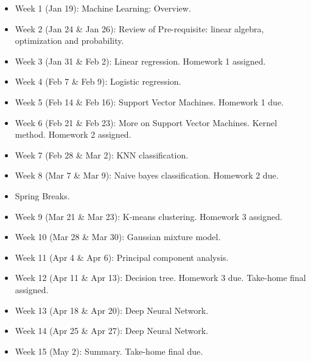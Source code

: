 \documentclass[a4paper,10pt]{article}
\begin{document}
\begin{itemize}
\item Week 1 (Jan 19): Machine Learning: Overview. 

\item Week 2 (Jan 24 \& Jan 26): Review of Pre-requisite: linear algebra, optimization and probability. 

\item Week 3 (Jan 31 \& Feb 2): Linear regression. Homework 1 assigned. 

\item Week 4 (Feb 7 \& Feb 9): Logistic regression. 

\item Week 5 (Feb 14 \& Feb 16): Support Vector Machines. Homework 1 due. 

\item Week 6 (Feb 21 \& Feb 23): More on Support Vector Machines. Kernel method. Homework 2 assigned.

\item Week 7 (Feb 28 \& Mar 2): KNN classification. 

\item Week 8 (Mar 7 \& Mar 9): Naive bayes classification.  Homework 2 due. 

\item Spring Breaks.

\item Week 9 (Mar 21 \& Mar 23): K-means clustering. Homework 3 assigned.

\item Week 10 (Mar 28 \& Mar 30): Gaussian mixture model.

\item Week 11 (Apr 4 \& Apr 6):  Principal component analysis. 

\item Week 12 (Apr 11 \& Apr 13): Decision tree.  Homework 3 due. Take-home final assigned.

\item Week 13 (Apr 18 \& Apr 20): Deep Neural Network.

\item Week 14 (Apr 25 \& Apr 27): Deep Neural Network.

\item Week 15 (May 2): Summary. Take-home final due. 
 
\end{itemize}
\end{document}
